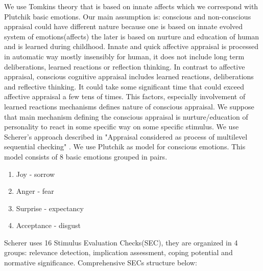 We use Tomkins theory that is based on innate affects which we correspond with Plutchik basic emotions\cite{natureofemotions}. Our main assumption is: conscious and non-conscious appraisal could have different nature because one is based on innate evolved system of emotions(affects) the later is based on nurture and education of human and is learned during childhood. Innate and quick affective appraisal is processed in automatic way mostly insensibly for human, it does not include long term deliberations, learned reactions or reflection thinking. In contrast to affective appraisal, conscious cognitive appraisal includes learned reactions, deliberations and reflective thinking. It could take some significant time that could exceed affective appraisal a few tens of times. This factors, especially involvement of learned reactions mechanisms defines nature of conscious appraisal. We suppose that main mechanism defining the conscious appraisal is nurture/education of personality to react in some specific way on some specific stimulus. We use Scherer's approach described in "Appraisal considered as process of multilevel sequential checking" \cite{appraisal_considered_as_a_process}. We use Plutchik \cite{natureofemotions} as model for conscious emotions. This model consists of 8 basic emotions grouped in pairs.

\begin{enumerate}
 \item  Joy - sorrow
 \item  Anger - fear
 \item  Surprise - expectancy
 \item  Acceptance - disgust
\end{enumerate}

Scherer uses 16 Stimulus Evaluation Checks(SEC), they are organized in 4 groups: relevance detection, implication assessment, coping potential and normative significance.
Comprehensive SECs structure below:

